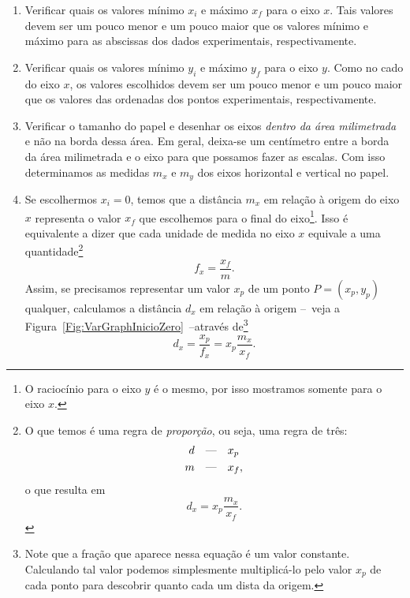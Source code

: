 \begin{enumerate}
	\item Verificar quais os valores mínimo $x_i$ e máximo $x_f$ para o eixo $x$. Tais valores devem ser um pouco menor e um pouco maior que os valores mínimo e máximo para as abscissas dos dados experimentais, respectivamente.
	\item Verificar quais os valores mínimo $y_i$ e máximo $y_f$ para o eixo $y$. Como no cado do eixo $x$, os valores escolhidos devem ser um pouco menor e um pouco maior que os valores das ordenadas dos pontos experimentais, respectivamente.
	\item Verificar o tamanho do papel e desenhar os eixos \emph{dentro da área milimetrada} e não na borda dessa área. Em geral, deixa-se um centímetro entre a borda da área milimetrada e o eixo para que possamos fazer as escalas. Com isso determinamos as medidas $m_x$ e $m_y$ dos eixos horizontal e vertical no papel.
	\item Se escolhermos $x_i = 0$, temos que a distância $m_x$ em relação à origem do eixo $x$ representa o valor $x_f$ que escolhemos para o final do eixo\footnote{O raciocínio para o eixo $y$ é o mesmo, por isso mostramos somente para o eixo $x$.}. Isso é equivalente a dizer que cada unidade de medida no eixo $x$ equivale a uma quantidade\footnote{O que temos é uma regra de \emph{proporção}, ou seja, uma regra de três: \begin{align} d &\quad\text{\textemdash}\quad x_p \\ m &\quad\text{\textemdash}\quad x_f, \end{align} o que resulta em \begin{equation} d_x = x_p \frac{m_x}{x_f}. \end{equation}}
	\begin{equation}
		f_x = \frac{x_f}{m}.
	\end{equation}
	Assim, se precisamos representar um valor $x_p$ de um ponto $P = (x_p,y_p)$ qualquer, calculamos a distância $d_x$ em relação à origem --~veja a Figura~\ref{Fig:VarGraphInicioZero}~--através de\footnote{Note que a fração que aparece nessa equação é um valor constante. Calculando tal valor podemos simplesmente multiplicá-lo pelo valor $x_p$ de cada ponto para descobrir quanto cada um dista da origem.}
	\begin{equation}
		d_x = \frac{x_p}{f_x} = x_p \frac{m_x}{x_f}.
	\end{equation}


\end{enumerate}
